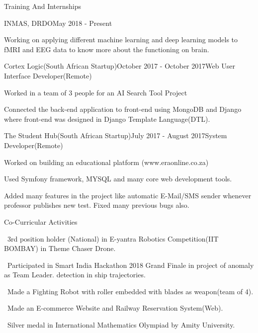 \documentclass{resume} %
\begin{document}
\begin{rSection}{Training And Internships}

\begin{rSubsection}{INMAS, DRDO}{May 2018 - Present}{}{}
\item Working on applying different machine learning and deep learning models to fMRI and EEG data to know more about the functioning on brain.
\end{rSubsection}



\begin{rSubsection}{Cortex Logic(South African Startup)}{October 2017 - October 2017}{Web User Interface Developer(Remote)}{}
\item Worked in a team of 3 people for an AI Search Tool Project
\item Connected the back-end application to front-end using MongoDB and Django where front-end was designed in Django Template Language(DTL).
\end{rSubsection}


\begin{rSubsection}{The Student Hub(South African Startup)}{July 2017 - August 2017}{System Developer(Remote)}{}
	\item Worked on building an educational platform (www.eraonline.co.za)
	\item Used Symfony framework, MYSQL and many core web development tools.
	\item Added many features in the project like automatic E-Mail/SMS sender
	whenever professor publishes new test. Fixed many previous bugs also.
\\	
\end{rSubsection}

\end{rSection}


\begin{rSection}{Co-Curricular Activities} \itemsep -2pt
\item \textbullet \ 3rd position holder (National) in E-yantra Robotics Competition(IIT BOMBAY)
in Theme Chaser Drone.
\item \textbullet \ Participated in Smart India Hackathon 2018 Grand Finale in project of anomaly as Team Leader.
detection in ship trajectories.
\item \textbullet \ Made a Fighting Robot with roller embedded with blades as weapon(team of 4).
\item \textbullet \ Made an E-commerce Website and Railway Reservation System(Web).
\item \textbullet \ Silver medal in International Mathematics Olympiad by Amity University.
\end{rSection}
\end{document}
